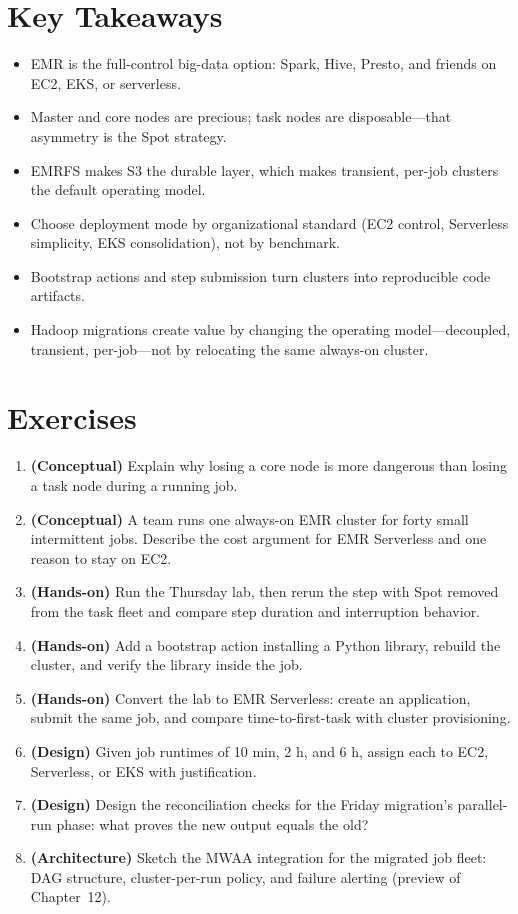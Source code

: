 \section*{Key Takeaways}
\begin{itemize}
    \item EMR is the full-control big-data option: Spark, Hive, Presto, and friends on EC2, EKS, or serverless.
    \item Master and core nodes are precious; task nodes are disposable---that asymmetry is the Spot strategy.
    \item EMRFS makes S3 the durable layer, which makes transient, per-job clusters the default operating model.
    \item Choose deployment mode by organizational standard (EC2 control, Serverless simplicity, EKS consolidation), not by benchmark.
    \item Bootstrap actions and step submission turn clusters into reproducible code artifacts.
    \item Hadoop migrations create value by changing the operating model---decoupled, transient, per-job---not by relocating the same always-on cluster.
\end{itemize}

\section{Exercises}
\begin{enumerate}
    \item \textbf{(Conceptual)} Explain why losing a core node is more dangerous than losing a task node during a running job.
    \item \textbf{(Conceptual)} A team runs one always-on EMR cluster for forty small intermittent jobs. Describe the cost argument for EMR Serverless and one reason to stay on EC2.
    \item \textbf{(Hands-on)} Run the Thursday lab, then rerun the step with Spot removed from the task fleet and compare step duration and interruption behavior.
    \item \textbf{(Hands-on)} Add a bootstrap action installing a Python library, rebuild the cluster, and verify the library inside the job.
    \item \textbf{(Hands-on)} Convert the lab to EMR Serverless: create an application, submit the same job, and compare time-to-first-task with cluster provisioning.
    \item \textbf{(Design)} Given job runtimes of 10 min, 2 h, and 6 h, assign each to EC2, Serverless, or EKS with justification.
    \item \textbf{(Design)} Design the reconciliation checks for the Friday migration's parallel-run phase: what proves the new output equals the old?
    \item \textbf{(Architecture)} Sketch the MWAA integration for the migrated job fleet: DAG structure, cluster-per-run policy, and failure alerting (preview of Chapter~12).
\end{enumerate}

